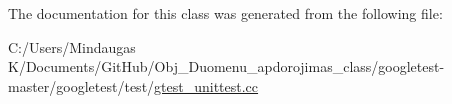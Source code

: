 The documentation for this class was generated from the following file\+:\begin{DoxyCompactItemize}
\item 
C\+:/\+Users/\+Mindaugas K/\+Documents/\+Git\+Hub/\+Obj\+\_\+\+Duomenu\+\_\+apdorojimas\+\_\+class/googletest-\/master/googletest/test/\mbox{\hyperlink{googletest-master_2googletest_2test_2gtest__unittest_8cc}{gtest\+\_\+unittest.\+cc}}\end{DoxyCompactItemize}
